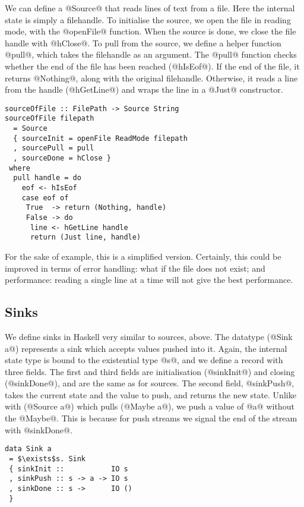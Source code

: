 We can define a @Source@ that reads lines of text from a file.
Here the internal state is simply a filehandle.
To initialise the source, we open the file in reading mode, with the @openFile@ function.
When the source is done, we close the file handle with @hClose@.
To pull from the source, we define a helper function @pull@, which takes the filehandle as an argument.
The @pull@ function checks whether the end of the file has been reached (@hIsEof@).
If the end of the file, it returns @Nothing@, along with the original filehandle.
Otherwise, it reads a line from the handle (@hGetLine@) and wraps the line in a @Just@ constructor.

\begin{lstlisting}
sourceOfFile :: FilePath -> Source String
sourceOfFile filepath
  = Source
  { sourceInit = openFile ReadMode filepath
  , sourcePull = pull
  , sourceDone = hClose }
 where
  pull handle = do
    eof <- hIsEof
    case eof of
     True  -> return (Nothing, handle)
     False -> do
      line <- hGetLine handle
      return (Just line, handle)
\end{lstlisting}

For the sake of example, this is a simplified version.
Certainly, this could be improved in terms of error handling: what if the file does not exist; and performance: reading a single line at a time will not give the best performance.

\subsection{Sinks}

We define sinks in Haskell very similar to sources, above.
The datatype (@Sink a@) represents a sink which accepts values pushed into it.
Again, the internal state type is bound to the existential type @s@, and we define a record with three fields.
The first and third fields are initialisation (@sinkInit@) and closing (@sinkDone@), and are the same as for sources.
The second field, @sinkPush@, takes the current state and the value to push, and returns the new state.
Unlike with (@Source a@) which pulls (@Maybe a@), we push a value of @a@ without the @Maybe@.
This is because for push streams we signal the end of the stream with @sinkDone@.

\begin{lstlisting}[mathescape=true]
data Sink a
 = $\exists$s. Sink
 { sinkInit ::           IO s
 , sinkPush :: s -> a -> IO s
 , sinkDone :: s ->      IO ()
 }
\end{lstlisting}

